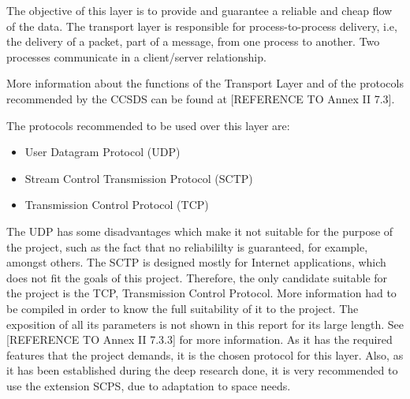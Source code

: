 The objective of this layer is to provide and guarantee a reliable and cheap flow of the data. The transport layer is responsible for process-to-process delivery, i.e, the delivery of a packet, part of a message, from one process to another. Two processes communicate in a client/server relationship. 

More information about the functions of the Transport Layer and of the protocols recommended by the CCSDS can be found at [REFERENCE TO Annex II 7.3].

The protocols recommended to be used over this layer are:

\begin{itemize}
\item User Datagram Protocol (UDP)
\item Stream Control Transmission Protocol (SCTP)
\item Transmission Control Protocol (TCP)
\end{itemize}

The UDP has some disadvantages which make it not suitable for the purpose of the project, such as the fact that no reliabililty is guaranteed, for example, amongst others. The SCTP is designed mostly for Internet applications, which does not fit the goals of this project. Therefore, the only candidate suitable for the project is the TCP, Transmission Control Protocol. More information had to be compiled in order to know the full suitability of it to the project. The exposition of all its parameters is not shown in this report for its large length. See [REFERENCE TO Annex II 7.3.3] for more information.  As it has the required features that the project demands, it is the chosen protocol for this layer. Also, as it has been established during the deep research done, it is very recommended to use the extension SCPS, due to adaptation to space needs.  